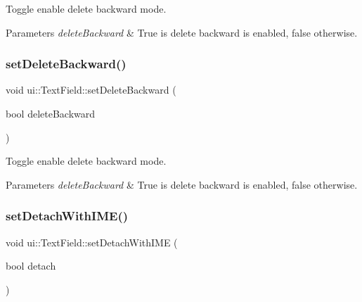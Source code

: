 Toggle enable delete backward mode. 


\begin{DoxyParams}{Parameters}
{\em delete\+Backward} & True is delete backward is enabled, false otherwise. \\
\hline
\end{DoxyParams}
\mbox{\label{classui_1_1TextField_af82f6143c7a6554e654a73527bf7e83e}} 
\subsubsection{\texorpdfstring{set\+Delete\+Backward()}{setDeleteBackward()}\hspace{0.1cm}{\footnotesize\ttfamily [2/2]}}
{\footnotesize\ttfamily void ui\+::\+Text\+Field\+::set\+Delete\+Backward (\begin{DoxyParamCaption}\item[{bool}]{delete\+Backward }\end{DoxyParamCaption})}



Toggle enable delete backward mode. 


\begin{DoxyParams}{Parameters}
{\em delete\+Backward} & True is delete backward is enabled, false otherwise. \\
\hline
\end{DoxyParams}
\mbox{\label{classui_1_1TextField_accfce2b8fdc0f2ae95e3f07dabd9f292}} 
\subsubsection{\texorpdfstring{set\+Detach\+With\+I\+M\+E()}{setDetachWithIME()}\hspace{0.1cm}{\footnotesize\ttfamily [1/2]}}
{\footnotesize\ttfamily void ui\+::\+Text\+Field\+::set\+Detach\+With\+I\+ME (\begin{DoxyParamCaption}\item[{bool}]{detach }\end{DoxyParamCaption})}



